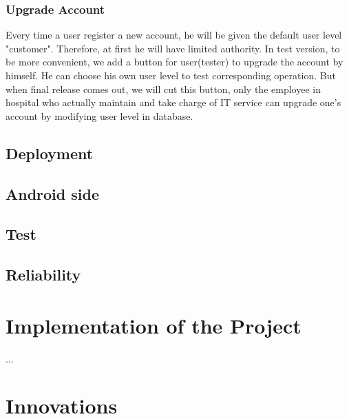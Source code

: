 \documentclass[a4paper]{article}
\begin{document}
\subsubsection{Upgrade Account}
Every time a user register a new account, he will be given the default user level "customer". Therefore, at first he will have limited authority. In test version, to be more convenient, we add a button for user(tester) to upgrade the account by himself. He can choose his own user level to test corresponding operation. But when final release comes out, we will cut this button, only the employee in hospital who actually maintain and take charge of IT service can upgrade one's account by modifying user level in database.
\subsection{Deployment}
\subsection{Android side}
\subsection{Test}
\subsection{Reliability}

\section{Implementation of the Project}

...

%
\section{Innovations}
\end{document}
